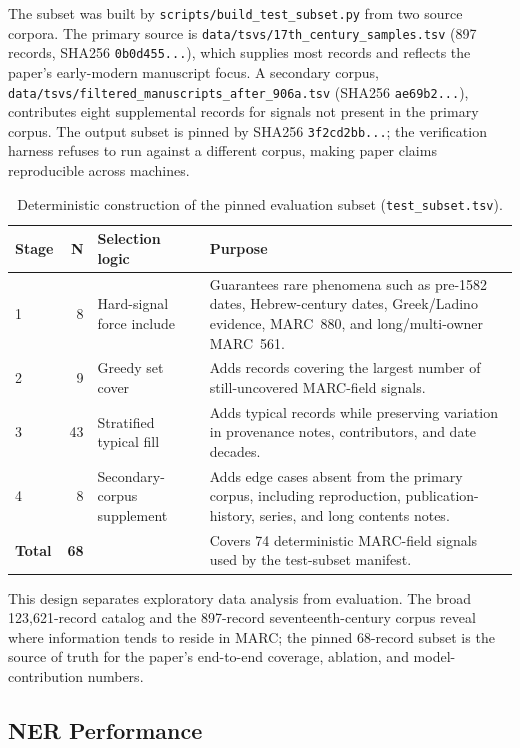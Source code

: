 \documentclass[Afour,sageh,times]{sagej}
\begin{document}
The subset was built by \texttt{scripts/build\_test\_subset.py} from two source corpora. The primary source is \texttt{data/tsvs/17th\_century\_samples.tsv} (897 records, SHA256 \texttt{0b0d455...}), which supplies most records and reflects the paper's early-modern manuscript focus. A secondary corpus, \texttt{data/tsvs/filtered\_manuscripts\_after\_906a.tsv} (SHA256 \texttt{ae69b2...}), contributes eight supplemental records for signals not present in the primary corpus. The output subset is pinned by SHA256 \texttt{3f2cd2bb...}; the verification harness refuses to run against a different corpus, making paper claims reproducible across machines.

\begin{table}[t]
\caption{Deterministic construction of the pinned evaluation subset (\texttt{test\_subset.tsv}).}
\label{tab:test-subset-selection}
\centering
\footnotesize
\begin{tabularx}{\textwidth}{lrlX}
\toprule
\textbf{Stage} & \textbf{N} & \textbf{Selection logic} & \textbf{Purpose} \\
\midrule
1 & 8 & Hard-signal force include & Guarantees rare phenomena such as pre-1582 dates, Hebrew-century dates, Greek/Ladino evidence, MARC~880, and long/multi-owner MARC~561. \\
2 & 9 & Greedy set cover & Adds records covering the largest number of still-uncovered MARC-field signals. \\
3 & 43 & Stratified typical fill & Adds typical records while preserving variation in provenance notes, contributors, and date decades. \\
4 & 8 & Secondary-corpus supplement & Adds edge cases absent from the primary corpus, including reproduction, publication-history, series, and long contents notes. \\
\midrule
\textbf{Total} & \textbf{68} &  & Covers 74 deterministic MARC-field signals used by the test-subset manifest. \\
\bottomrule
\end{tabularx}
\end{table}

This design separates exploratory data analysis from evaluation. The broad 123,621-record catalog and the 897-record seventeenth-century corpus reveal where information tends to reside in MARC; the pinned 68-record subset is the source of truth for the paper's end-to-end coverage, ablation, and model-contribution numbers.

\subsection{NER Performance}
\end{document}

